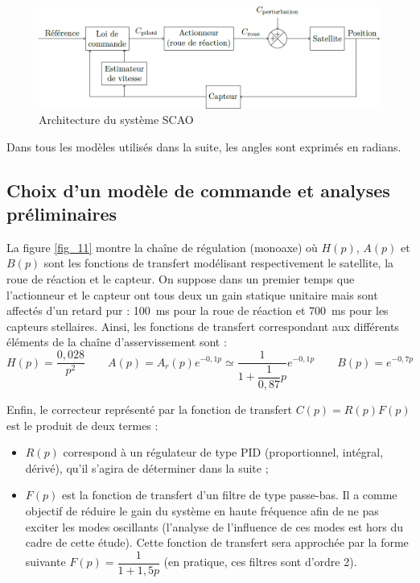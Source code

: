 \begin{figure}[H]
\centering
\includegraphics[width=.8\linewidth]{images/fig_10}
\caption{Architecture du système SCAO \label{fig_10}}
\end{figure}

Dans tous les modèles utilisés dans la suite, les angles sont exprimés en radians.

\fi

\subsection{\label{sec:3:A} Choix d’un modèle de commande et analyses préliminaires}

\ifprof
\else


La figure \autoref{fig_11} montre la chaîne de régulation (monoaxe) où $H(p)$, $A(p)$ et $B(p)$ sont les fonctions de transfert modélisant respectivement le satellite, la roue de réaction et le capteur. On suppose dans un premier temps que l’actionneur et le capteur ont tous deux un gain statique unitaire mais sont affectés d’un retard pur : \SI{100}{ms} pour la roue de réaction et \SI{700}{ms} pour les capteurs stellaires. 
Ainsi, les fonctions de transfert correspondant aux différents éléments de la chaîne d’asservissement sont :
$$
H(p)=\dfrac{0,028}{p^2} 
\quad \quad 
A(p)=A_r (p) e^{-0,1p}\simeq \dfrac{1}{1+\dfrac{1}{0,87}p}e^{-0,1 p} 
\quad \quad 
B(p)=e^{-0,7p}
$$


Enfin, le correcteur représenté par la fonction de transfert $C(p) = R(p) F(p)$ est le produit de deux termes :
\begin{itemize}
\item $R(p)$ correspond à un régulateur de type PID (proportionnel, intégral, dérivé), qu’il s’agira de déterminer
dans la suite ;
\item $F(p)$ est la fonction de transfert d’un filtre de type passe-bas. Il a comme objectif de réduire le gain du système
en haute fréquence afin de ne pas exciter les modes oscillants (l’analyse de l’influence de ces modes est hors
du cadre de cette étude). Cette fonction de transfert sera approchée par la forme suivante 
$F(p) = \dfrac{1}{1 + 1,5p}$ (en pratique, ces filtres sont d’ordre 2).
\end{itemize}
\fi


